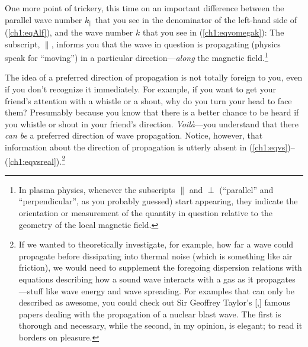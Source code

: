 
One more point of trickery, this time on an important difference between the
parallel wave number $k_\parallel$ that you see in the denominator of the
left-hand side of (\ref{ch1:eqAlf}), and the wave number $k$ that you see in
(\ref{ch1:eqvomegak}): The subscript, $\parallel$, informs you that the wave in
question is propagating (physics speak for ``moving'') in a particular
direction---\emph{along} the magnetic field.\footnote{In plasma physics,
  whenever the subscripts $\parallel$ and $\perp$ (``parallel'' and
  ``perpendicular'', as you probably guessed) start appearing, they indicate the
  orientation or measurement of the quantity in question relative to the
  geometry of the local magnetic field.}

The idea of a preferred direction of propagation is not totally foreign to you,
even if you don't recognize it immediately. For example, if you want to get your
friend's attention with a whistle or a shout, why do you turn your head to face
them? Presumably because you know that there is a better chance to be heard if
you whistle or shout in your friend's direction. \textit{Voil\`{a}}---you
understand that there \emph{can be} a preferred direction of wave
propagation. Notice, however, that information about the direction of
propagation is utterly absent in
(\ref{ch1:eqvs})--(\ref{ch1:eqvsreal}).\footnote{If we wanted to theoretically
  investigate, for example, how far a wave could propagate before dissipating
  into thermal noise (which is something like air friction), we would need to
  supplement the foregoing dispersion relations with equations describing how a
  sound wave interacts with a gas as it propagates---stuff like wave energy and
  wave spreading. For examples that can only be described as awesome, you could
  check out Sir Geoffrey Taylor's [\citeyear{Taylor1950},\citeyear{Taylor1950a}]
  famous papers dealing with the propagation of a nuclear blast wave. The first
  is thorough and necessary, while the second, in my opinion, is elegant; to
  read it borders on pleasure.}


